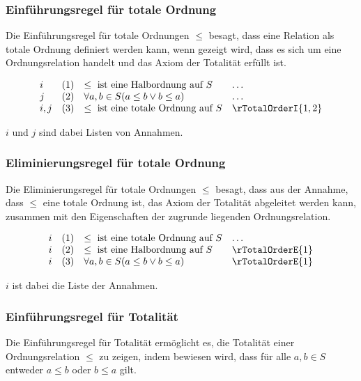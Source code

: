 \documentclass{book}
\theoremstyle{plain}
\theoremstyle{remark}
\theoremstyle{definition}
\begin{document}
\subsubsection*{Einführungsregel für totale Ordnung}
\label{rule:rTotalOrderI}
Die Einführungsregel für totale Ordnungen \(\leq\) besagt, dass eine Relation als totale Ordnung definiert werden kann, wenn gezeigt wird, dass es sich um eine Ordnungsrelation handelt und das Axiom der Totalität erfüllt ist.

\[
\begin{array}{llll}
    i       & (1) & \leq \text{ ist eine Halbordnung auf } S & \dots \\
    j       & (2) & \forall a, b \in S (a \leq b \lor b \leq a) & \dots \\
    i,j     & (3) & \leq \text{ ist eine totale Ordnung auf } S & \rTotalOrderI{1,2}
\end{array}
\]

\(i\) und \(j\) sind dabei Listen von Annahmen.

\subsubsection*{Eliminierungsregel für totale Ordnung}
\label{rule:rTotalOrderE}
Die Eliminierungsregel für totale Ordnungen \(\leq\) besagt, dass aus der Annahme, dass \(\leq\) eine totale Ordnung ist, das Axiom der Totalität abgeleitet werden kann, zusammen mit den Eigenschaften der zugrunde liegenden Ordnungsrelation.

\[
\begin{array}{llll}
    i       & (1) & \leq \text{ ist eine totale Ordnung auf } S & \dots \\
    i       & (2) & \leq \text{ ist eine Halbordnung auf } S & \rTotalOrderE{1} \\
    i       & (3) & \forall a, b \in S (a \leq b \lor b \leq a) & \rTotalOrderE{1}
\end{array}
\]

\(i\) ist dabei die Liste der Annahmen.

\subsubsection*{Einführungsregel für Totalität}
\label{rule:rTotalityOrdRI}
Die Einführungsregel für Totalität ermöglicht es, die Totalität einer Ordnungsrelation \(\leq\) zu zeigen, indem bewiesen wird, dass für alle \(a, b \in S\) entweder \(a \leq b\) oder \(b \leq a\) gilt.
\end{document}
